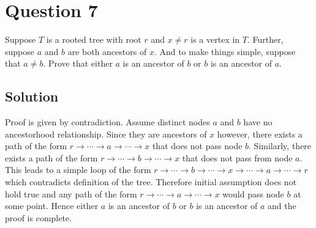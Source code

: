 
\section*{Question 7}

Suppose $T$ is a rooted tree with root $r$ and $x \neq r$ is a vertex in $T$.
Further, suppose $a$ and $b$ are both ancestors of $x$.
And to make things simple, suppose that $a \neq b$.
Prove that either $a$ is an ancestor of $b$ or $b$ is an ancestor of $a$.

\subsection*{Solution}

Proof is given by contradiction.
Assume distinct nodes $a$ and $b$ have no ancestorhood relationship.
Since they are ancestors of $x$ however, there exists a path of the form $r \rightarrow \cdots \rightarrow a \rightarrow \cdots \rightarrow x$ that does not pass node $b$.
Similarly, there exists a path of the form $r \rightarrow \cdots \rightarrow b \rightarrow \cdots \rightarrow x$ that does not pass from node $a$.
This leads to a simple loop of the form $r \rightarrow \cdots \rightarrow b \rightarrow \cdots \rightarrow x \rightarrow \cdots \rightarrow a \rightarrow \cdots \rightarrow r$ which contradicts definition of the tree.
Therefore initial assumption does not hold true and any path of the form $r \rightarrow \cdots \rightarrow a \rightarrow \cdots \rightarrow x$ would pass node $b$ at some point.
Hence either $a$ is an ancestor of $b$ or $b$ is an ancestor of $a$ and the proof is complete.
